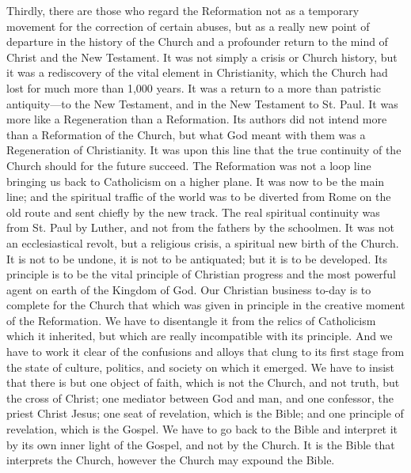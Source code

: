 \documentclass[12pt,a5paper,twoside]{book}
\begin{document}
Thirdly, there are those who regard the Reformation 
not as a temporary movement for the correction 
of certain abuses, but as a really new point of departure 
in the history of the Church and a profounder 
return to the mind of Christ and the New Testament. 
It was not simply a crisis or Church history, 
but it was a rediscovery of the vital element in Christianity, 
which the Church had lost for much more 
than 1,000 years. It was a return to a more than 
patristic antiquity---to the New Testament, and in the 
New Testament to St. Paul. It was more like a 
Regeneration than a Reformation. Its authors did not 
intend more than a Reformation of the Church, but 
what God meant with them was a Regeneration of 
Christianity. It was upon this line that the true continuity
of the Church should for the future succeed. 
The Reformation was not a loop line bringing us back 
to Catholicism on a higher plane. It was now to 
be the main line; and the spiritual traffic of the 
world was to be diverted from Rome on the old route 
and sent chiefly by the new track. The real spiritual 
continuity was from St. Paul by Luther, and not 
from the fathers by the schoolmen. It was not an 
ecclesiastical revolt, but a religious crisis, a spiritual 
new birth of the Church. It is not to be undone, 
it is not to be antiquated; but it is to be developed. 
Its principle is to be the vital principle of Christian 
progress and the most powerful agent on earth of the 
Kingdom of God. Our Christian business to-day is 
to complete for the Church that which was given in 
principle in the creative moment of the Reformation. 
We have to disentangle it from the relics of Catholicism 
which it inherited, but which are really incompatible 
with its principle. And we have to work it 
clear of the confusions and alloys that clung to its 
first stage from the state of culture, politics, and 
society on which it emerged. We have to insist that 
there is but one object of faith, which is not the 
Church, and not truth, but the cross of Christ; one 
mediator between God and man, and one confessor, 
the priest Christ Jesus; one seat of revelation, which 
is the Bible; and one principle of revelation, which is 
the Gospel. We have to go back to the Bible and 
interpret it by its own inner light of the Gospel, and 
not by the Church. It is the Bible that interprets the 
Church, however the Church may expound the Bible. 
\end{document}
